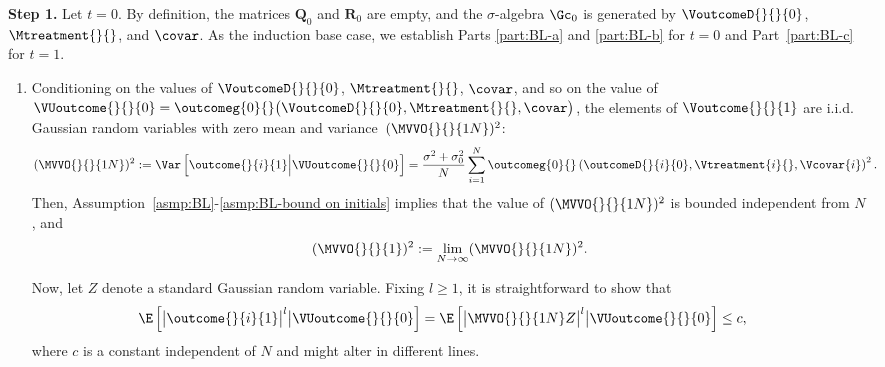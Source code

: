 \textbf{Step 1.} Let $t = 0$. By definition, the matrices $\bm{Q}_0$ and $\bm{R}_0$ are empty, and the $\sigma$-algebra $\Gc_0$ is generated by $\VoutcomeD{}{}{0}$, $\Mtreatment{}{}$, and $\covar$. As the induction base case, we establish Parts \ref{part:BL-a} and \ref{part:BL-b} for $t=0$ and Part~\ref{part:BL-c} for $t = 1$.
% 
\begin{enumerate}[label=(\alph*)]
    \item \label{item:BL-average limit} Conditioning on the values of $\VoutcomeD{}{}{0}$, $\Mtreatment{}{}$, $\covar$, and so on the value of $\VUoutcome{}{}{0} = \outcomeg{0}{}\big(\VoutcomeD{}{}{0},\Mtreatment{}{},\covar\big)$, the elements of $\Voutcome{}{}{1}$ are i.i.d. Gaussian random variables with zero mean and variance~$(\MVVO{}{}{1N})^2$:
    \begin{equation}
        \label{eq:BL-a0-Y1 stat}
        \begin{aligned}
            (\MVVO{}{}{1N})^2
            &:=
            \Var
            \left[
            \outcome{}{i}{1}
            \Big|
            \VUoutcome{}{}{0}
            \right]
            =
            \frac{\sigma^2 + \sigma^2_0}{N}
            \sum_{i=1}^N
            \outcomeg{0}{} \left(\outcomeD{}{i}{0},\Vtreatment{i}{},\Vcovar{i}
            \right)^2.
        \end{aligned}
    \end{equation}
    Then, Assumption~\ref{asmp:BL}-\ref{asmp:BL-bound on initials} implies that the value of $(\MVVO{}{}{1N})^2$ is bounded independent from $N$, and
    \begin{equation}
        \label{eq:BL-a0-Y1 stats limits}
        \begin{aligned}
            (\MVVO{}{}{1})^2 :=
            \lim_{N\rightarrow \infty} (\MVVO{}{}{1N})^2.
        \end{aligned}
    \end{equation}
    
    Now, let $Z$ denote a standard Gaussian random variable. Fixing $l \geq 1$, it is straightforward to show that
    \begin{equation}
    \begin{aligned}
    \label{eq:BL-proof-a0-1}
        \E
        \left[
        \big|\outcome{}{i}{1}\big|^l
        \big|
        \VUoutcome{}{}{0}
        \right]
        &=
        \E
        \left[
        \big|\MVVO{}{}{1N} Z\big|^l
        \big|
        \VUoutcome{}{}{0}
        \right] \leq c,
    \end{aligned}
    \end{equation}
    where $c$ is a constant independent of $N$ and might alter in different lines.


\end{enumerate}
